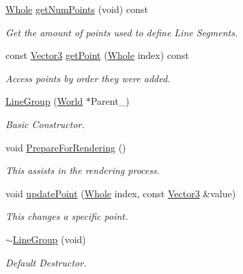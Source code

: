 \begin{DoxyCompactItemize}
\hyperlink{namespaceMezzanine_adcbb6ce6d1eb4379d109e51171e2e493}{Whole} \hyperlink{classMezzanine_1_1LineGroup_a518e2ccf64cb6dc9bcc309a08d40f8c9}{getNumPoints} (void) const 
\begin{DoxyCompactList}\small\item\em Get the amount of points used to define Line Segments. \item\end{DoxyCompactList}\item 
const \hyperlink{classMezzanine_1_1Vector3}{Vector3} \hyperlink{classMezzanine_1_1LineGroup_a5a6aca5f86fa5751b335ee4a3d498cbf}{getPoint} (\hyperlink{namespaceMezzanine_adcbb6ce6d1eb4379d109e51171e2e493}{Whole} index) const 
\begin{DoxyCompactList}\small\item\em Access points by order they were added. \item\end{DoxyCompactList}\item 
\hyperlink{classMezzanine_1_1LineGroup_a8789254da1d3e930681b793165fedeca}{LineGroup} (\hyperlink{classMezzanine_1_1World}{World} $\ast$Parent\_\-)
\begin{DoxyCompactList}\small\item\em Basic Constructor. \item\end{DoxyCompactList}\item 
void \hyperlink{classMezzanine_1_1LineGroup_ab94688dd800d390aefce0e6b9742b296}{PrepareForRendering} ()
\begin{DoxyCompactList}\small\item\em This assists in the rendering process. \item\end{DoxyCompactList}\item 
void \hyperlink{classMezzanine_1_1LineGroup_adfb54ecbd62dc13d42b4e05c1b30a155}{updatePoint} (\hyperlink{namespaceMezzanine_adcbb6ce6d1eb4379d109e51171e2e493}{Whole} index, const \hyperlink{classMezzanine_1_1Vector3}{Vector3} \&value)
\begin{DoxyCompactList}\small\item\em This changes a specific point. \item\end{DoxyCompactList}\item 
\hyperlink{classMezzanine_1_1LineGroup_afd14821b5b54fff9d670458748125f3f}{$\sim$LineGroup} (void)
\begin{DoxyCompactList}\small\item\em Default Destructor. \item\end{DoxyCompactList}\end{DoxyCompactItemize}


